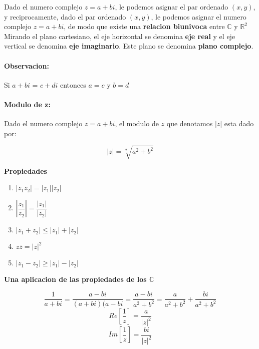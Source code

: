 \documentclass[10pt]{article}
\begin{document}
Dado el numero complejo $z = a+bi$, le podemos asignar el par ordenado $(x,y)$, y reciprocamente, dado el par ordenado $(x,y)$, le podemos asignar el numero complejo $z = a+bi$, de modo que existe una \textbf{relacion biunivoca} entre $\mathbb{C}$ y $\mathbb{R}^2$\\

Mirando el plano cartesiano, el eje horizontal se denomina \textbf{eje real} y el eje vertical se denomina \textbf{eje imaginario}. Este plano se denomina \textbf{plano complejo}.\\

\paragraph{Observacion: }Si $a+bi$ = $c+di$ entonces $a=c$ y $b=d$

\paragraph{Modulo de z: } Dado el numero complejo $z = a+bi$, el modulo de $z$ que denotamos $|z|$ esta dado por:

\begin{equation*}
	|z| = \sqrt[2]{a^2+b^2}
\end{equation*}

\begin{center}
	\textbf{Propiedades}
\end{center}
\begin{enumerate}
	\item $|z_1 z_2| = |z_1||z_2|$
	\item $\left|\dfrac{z_1}{z_2}\right| = \dfrac{|z_1|}{|z_2|}$
	\item $|z_1 + z_2| \leq |z_1|+|z_2|$
	\item $z\overline{z} = |z|^2$
	\item $|z_1 - z_2| \geq |z_1|-|z_2|$ 
\end{enumerate}

\begin{center}
\textbf{Una aplicacion de las propiedades de los $\mathbb{C}$}
\end{center}

\begin{equation*}
	\dfrac{1}{a+bi} = \dfrac{a-bi}{(a+bi)(a-bi} = \dfrac{a-bi}{a^2+b^2} = \dfrac{a}{a^2+b^2} + \dfrac{bi}{a^2+b^2}
\end{equation*}
\begin{equation*}
	Re \left[\frac{1}{z}\right] = \dfrac{a}{|z|^2}	
\end{equation*}
\begin{equation*}
	Im \left[\frac{1}{z}\right] = \dfrac{bi}{|z|^2}
\end{equation*}
\end{document}
